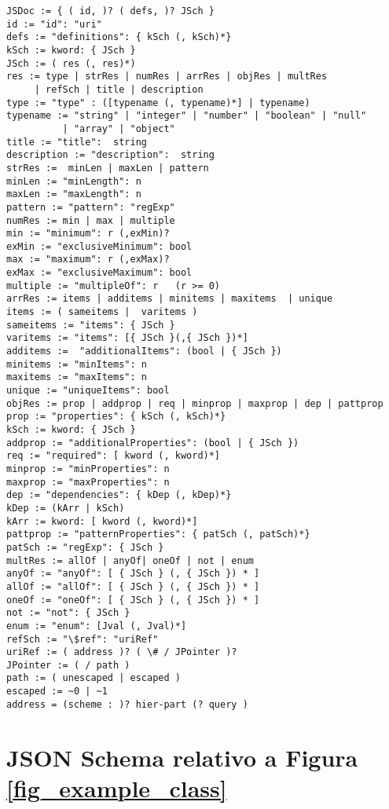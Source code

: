 \begin{anexosenv}
\begin{lstlisting}
JSDoc := { ( id, )? ( defs, )? JSch }
id := "id": "uri"
defs := "definitions": { kSch (, kSch)*}
kSch := kword: { JSch }
JSch := ( res (, res)*)
res := type | strRes | numRes | arrRes | objRes | multRes
     | refSch | title | description
type := "type" : ([typename (, typename)*] | typename)
typename := "string" | "integer" | "number" | "boolean" | "null"
          | "array" | "object"
title := "title":  string
description := "description":  string
strRes :=  minLen | maxLen | pattern
minLen := "minLength": n
maxLen := "maxLength": n
pattern := "pattern": "regExp"
numRes := min | max | multiple 
min := "minimum": r (,exMin)?
exMin := "exclusiveMinimum": bool
max := "maximum": r (,exMax)?
exMax := "exclusiveMaximum": bool
multiple := "multipleOf": r   (r >= 0)
arrRes := items | additems | minitems | maxitems  | unique
items := ( sameitems |  varitems )
sameitems := "items": { JSch }
varitems := "items": [{ JSch }(,{ JSch })*] 
additems :=  "additionalItems": (bool | { JSch })
minitems := "minItems": n
maxitems := "maxItems": n
unique := "uniqueItems": bool
objRes := prop | addprop | req | minprop | maxprop | dep | pattprop
prop := "properties": { kSch (, kSch)*}
kSch := kword: { JSch }
addprop := "additionalProperties": (bool | { JSch })
req := "required": [ kword (, kword)*]
minprop := "minProperties": n
maxprop := "maxProperties": n
dep := "dependencies": { kDep (, kDep)*}
kDep := (kArr | kSch)
kArr := kword: [ kword (, kword)*]
pattprop := "patternProperties": { patSch (, patSch)*}
patSch := "regExp": { JSch }
multRes := allOf | anyOf| oneOf | not | enum
anyOf := "anyOf": [ { JSch } (, { JSch }) * ]
allOf := "allOf": [ { JSch } (, { JSch }) * ]
oneOf := "oneOf": [ { JSch } (, { JSch }) * ]
not := "not": { JSch }
enum := "enum": [Jval (, Jval)*]
refSch := "\$ref": "uriRef" 
uriRef := ( address )? ( \# / JPointer )?
JPointer := ( / path )
path := ( unescaped | escaped )
escaped := ~0 | ~1
address = (scheme : )? hier-part (? query )

\end{lstlisting}


\chapter{JSON Schema relativo a Figura \ref{fig_example_class}}
\label{fig_example_class_j}


\end{anexosenv}
